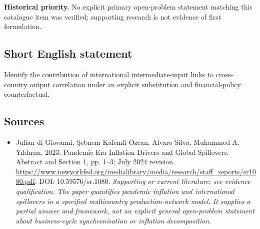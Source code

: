 \documentclass[11pt]{article}
\begin{document}
\par\textbf{Historical priority.} No explicit primary open-problem statement matching this catalogue item was verified; supporting research is not evidence of first formulation.

\subsection{Short English statement}
Identify the contribution of international intermediate-input links to cross-country output correlation under an explicit substitution and financial-policy counterfactual.

\subsection{Sources}
\begin{itemize}\raggedright
\item[\textnormal{[S1]}]\hypertarget{source:30007519:1}{} Julian di Giovanni, Şebnem Kalemli-Özcan, Alvaro Silva, Muhammed A. Yıldırım. 2023. Pandemic-Era Inflation Drivers and Global Spillovers. Abstract and Section 1, pp. 1–3; July 2024 revision.
\url{https://www.newyorkfed.org/medialibrary/media/research/staff_reports/sr1080.pdf}.
DOI: 10.59576/sr.1080.
{\small\textit{Supporting or current literature; see evidence qualification. The paper quantifies pandemic inflation and international spillovers in a specified multicountry production-network model. It supplies a partial answer and framework, not an explicit general open-problem statement about business-cycle synchronisation or inflation decomposition.}}
\end{itemize}
\end{document}
